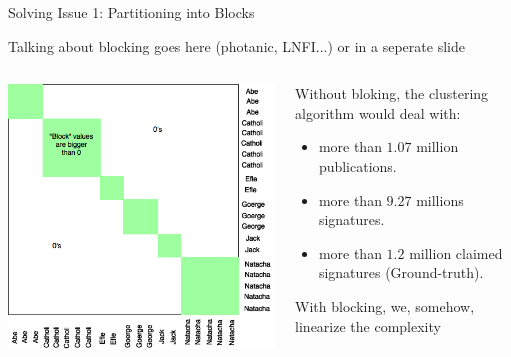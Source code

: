 \documentclass{beamer}
\begin{document}
\begin{frame} {Solving Issue 1: Partitioning into Blocks}

Talking about blocking goes here (photanic, LNFI...) or in a seperate slide

\begin{columns}[T]

\begin{column}{0.5\textwidth}
\includegraphics[width=\textwidth]{./figures/blocking.png}
\end{column}
\begin{column}{0.5\textwidth}

Without bloking, the clustering algorithm would deal with:
\begin{itemize}
\item more than $1.07$  million publications.

\item more than $9.27$ millions signatures.

\item more than $1.2$ million claimed signatures (Ground-truth).
\end{itemize}

With blocking, we, somehow, linearize the complexity

\end{column}

\end{columns}

\end{frame}
\end{document}
